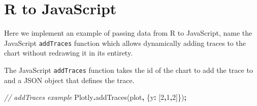 \documentclass[
]{krantz}
\makeatletter
\newenvironment{Shaded}{\begin{snugshade}}{\end{snugshade}}
\newcommand{\CommentTok}[1]{\textcolor[rgb]{0.37,0.37,0.37}{\textit{#1}}}
\newcommand{\ControlFlowTok}[1]{\textcolor[rgb]{0.27,0.27,0.27}{\textbf{#1}}}
\newcommand{\DataTypeTok}[1]{\textcolor[rgb]{0.27,0.27,0.27}{#1}}
\newcommand{\DecValTok}[1]{\textcolor[rgb]{0.06,0.06,0.06}{#1}}
\newcommand{\FunctionTok}[1]{\textcolor[rgb]{0,0,0}{#1}}
\newcommand{\KeywordTok}[1]{\textcolor[rgb]{0.27,0.27,0.27}{\textbf{#1}}}
\newcommand{\NormalTok}[1]{#1}
\newcommand{\OperatorTok}[1]{\textcolor[rgb]{0.43,0.43,0.43}{\textbf{#1}}}
\newcommand{\StringTok}[1]{\textcolor[rgb]{0.5,0.5,0.5}{#1}}
\newenvironment{kframe}{%
\medskip{}
\setlength{\fboxsep}{.8em}
 \def\at@end@of@kframe{}%
 \ifinner\ifhmode%
  \def\at@end@of@kframe{\end{minipage}}%
  \begin{minipage}{\columnwidth}%
 \fi\fi%
 \def\FrameCommand##1{\hskip\@totalleftmargin \hskip-\fboxsep
 \colorbox{shadecolor}{##1}\hskip-\fboxsep
     \hskip-\linewidth \hskip-\@totalleftmargin \hskip\columnwidth}%
 \MakeFramed {\advance\hsize-\width
   \@totalleftmargin\z@ \linewidth\hsize
   \@setminipage}}%
 {\par\unskip\endMakeFramed%
 \at@end@of@kframe}
\renewenvironment{Shaded}{\begin{kframe}}{\end{kframe}}
\makeatother
\begin{document}
\begin{Shaded}
\end{Shaded}

\hypertarget{widgets-ex-plotly-r-to-js}{%
\section{R to JavaScript}\label{widgets-ex-plotly-r-to-js}}

Here we implement an example of passing data from R to JavaScript, name the JavaScript \texttt{addTraces} function which allows dynamically adding traces to the chart without redrawing it in its entirety.

The JavaScript \texttt{addTraces} function takes the id of the chart to add the trace to and a JSON object that defines the trace.

\begin{Shaded}
\begin{Highlighting}[]
\CommentTok{// addTraces example}
\NormalTok{Plotly}\OperatorTok{.}\FunctionTok{addTraces}\NormalTok{(}\StringTok{\textquotesingle{}plot\textquotesingle{}}\OperatorTok{,}\NormalTok{ \{}\DataTypeTok{y}\OperatorTok{:}\NormalTok{ [}\DecValTok{2}\OperatorTok{,}\DecValTok{1}\OperatorTok{,}\DecValTok{2}\NormalTok{]\})}\OperatorTok{;}
\end{Highlighting}
\end{Shaded}
\end{document}
